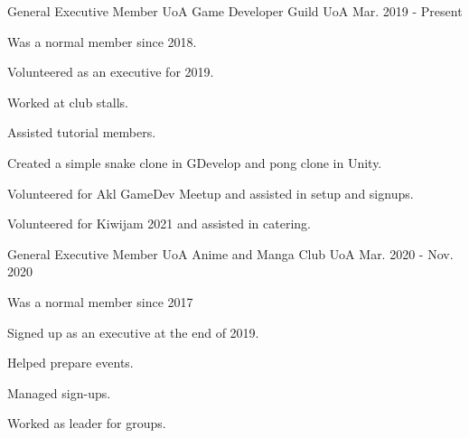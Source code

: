 

\begin{cventries}

\cventry
{General Executive Member} %
{UoA Game Developer Guild} %
{UoA} %
{Mar. 2019 - Present} %
{
  \begin{cvitems} %
    \item {Was a normal member since 2018.}
    \item {Volunteered as an executive for 2019.}
    \item {Worked at club stalls.}
    \item {Assisted tutorial members.}
    \item {Created a simple snake clone in GDevelop and pong clone in Unity.}
    \item {Volunteered for Akl GameDev Meetup and assisted in setup and signups.}
    \item {Volunteered for Kiwijam 2021 and assisted in catering.}
  \end{cvitems}
}

  \cventry
    {General Executive Member} %
    {UoA Anime and Manga Club} %
    {UoA} %
    {Mar. 2020 - Nov. 2020} %
    {
      \begin{cvitems} %
        \item {Was a normal member since 2017}
        \item {Signed up as an executive at the end of 2019.}
        \item {Helped prepare events.}
        \item {Managed sign-ups.}
        \item {Worked as leader for groups.}
      \end{cvitems}
    }


\end{cventries}
